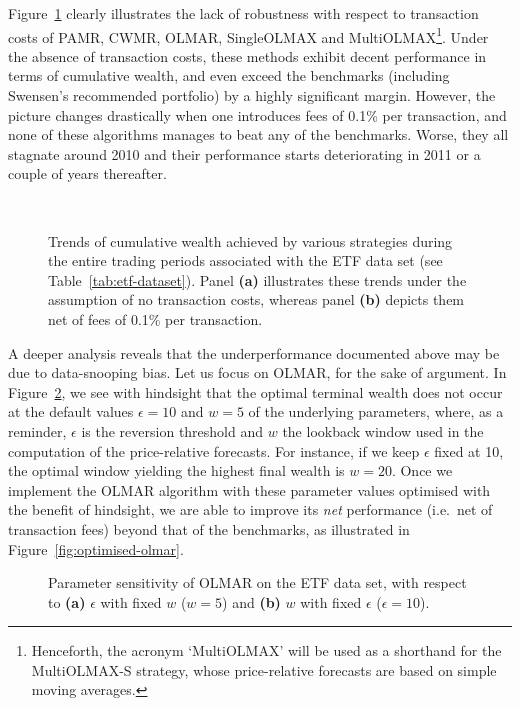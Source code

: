 Figure~\ref{fig:etf-cumwealth} clearly illustrates the lack of robustness with respect to transaction costs of PAMR, CWMR, OLMAR, SingleOLMAX and MultiOLMAX\footnote{Henceforth, the acronym `MultiOLMAX' will be used as a shorthand for the MultiOLMAX-S strategy, whose price-relative forecasts are based on simple moving averages.}. Under the absence of transaction costs, these methods exhibit decent performance in terms of cumulative wealth, and even exceed the benchmarks (including Swensen's recommended portfolio) by a highly significant margin. However, the picture changes drastically when one introduces fees of 0.1\% per transaction, and none of these algorithms manages to beat any of the benchmarks. Worse, they all stagnate around 2010 and their performance starts deteriorating in 2011 or a couple of years thereafter.
\begin{figure}[H]
    \,
\caption{Trends of cumulative wealth achieved by various strategies during the entire trading periods associated with the ETF data set (see Table~\ref{tab:etf-dataset}). Panel \textbf{(a)} illustrates these trends under the assumption of no transaction costs, whereas panel \textbf{(b)} depicts them net of fees of 0.1\% per transaction.}
\label{fig:etf-cumwealth}
\end{figure}

A deeper analysis reveals that the underperformance documented above may be due to data-snooping bias. Let us focus on OLMAR, for the sake of argument. In Figure~\ref{fig:olmar-sensitivity}, we see with hindsight that the optimal terminal wealth does not occur at the default values $\epsilon = 10$ and $w = 5$ of the underlying parameters, where, as a reminder, $\epsilon$ is the reversion threshold and $w$ the lookback window used in the computation of the price-relative forecasts. For instance, if we keep $\epsilon$ fixed at 10, the optimal window yielding the highest final wealth is $w = 20$. Once we implement the OLMAR algorithm with these parameter values optimised with the benefit of hindsight, we are able to improve its \emph{net} performance (i.e.\ net of transaction fees) beyond that of the benchmarks, as illustrated in Figure~\ref{fig:optimised-olmar}.

\begin{figure}[H]
\caption{Parameter sensitivity of OLMAR on the ETF data set, with respect to \textbf{(a)} $\epsilon$ with fixed $w$ ($w = 5$) and \textbf{(b)} $w$ with fixed $\epsilon$ ($\epsilon = 10$).}
\label{fig:olmar-sensitivity}
\end{figure}

